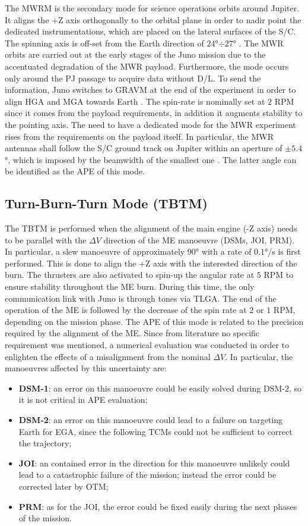 The MWRM is the secondary mode for science operations orbits around Jupiter. It aligns the +Z axis orthogonally to the orbital plane in order to nadir point the dedicated instrumentations, which are placed on the lateral surfaces of the S/C. 
The spinning axis is off-set from the Earth direction of $24$°$\div$$27$° \cite{shadan}.
The MWR orbits are carried out at the early stages of the Juno mission due to the accentuated degradation of the MWR payload. Furthermore, the mode occurs only around the PJ passage to acquire data without D/L.
To send the information, Juno switches to GRAVM at the end of the experiment in order to align HGA and MGA towards Earth \cite{stuart}.
The spin-rate is nominally set at $2$ RPM since it comes from the payload requirements, in addition it augments stability to the pointing axis. 
The need to have a dedicated mode for the MWR experiment rises from the requirements on the payload itself.
In particular, the MWR antennas shall follow the S/C ground track on Jupiter within an aperture of $\pm 5.4$°, which is imposed by the beamwidth of the smallest one \cite{mwr}.
The latter angle can be identified as the APE of this mode.

\subsection{Turn-Burn-Turn Mode (TBTM)}
\label{subsec:tbt_mode}

The TBTM is performed when the alignment of the main engine (-Z axis) needs to be parallel with the $\Delta V$ direction of the ME manoeuvre (DSMs, JOI, PRM).
In particular, a slew manoeuvre of approximately $90$° with a rate of $0.1$°/s is first performed. This is done to align the +Z axis with the interested direction of the burn.
The thrusters are also activated to spin-up the angular rate at $5$ RPM to ensure stability throughout the ME burn. During this time, the only communication link with Juno is through tones via TLGA.
The end of the operation of the ME is followed by the decrease of the spin rate at $2$ or $1$ RPM, depending on the mission phase. The APE of this mode is related to the precision required by the alignment of the ME.
Since from literature no specific requirement was mentioned, a numerical evaluation was conducted in order to enlighten the effects of a misalignment from the nominal $\Delta V$.
In particular, the manoeuvres affected by this uncertainty are:
\begin{itemize}
    \item \textbf{DSM-1}: an error on this manoeuvre could be easily solved during DSM-2, so it is not critical in APE evaluation;
    \item \textbf{DSM-2}: an error on this manoeuvre could lead to a failure on targeting Earth for EGA, since the following TCMs could not be sufficient to correct the trajectory;
    \item \textbf{JOI}: an contained error in the direction for this manoeuvre unlikely could lead to a catastrophic failure of the mission; instead the error could be corrected later by OTM;
    \item \textbf{PRM}: as for the JOI, the error could be fixed easily during the next phases of the mission.
\end{itemize}

